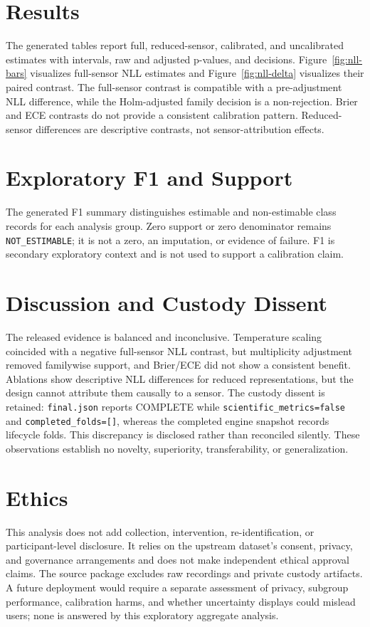 \documentclass[11pt]{article}
\begin{document}
\section{Results}
The generated tables report full, reduced-sensor, calibrated, and uncalibrated estimates with intervals, raw and adjusted p-values, and decisions. Figure~\ref{fig:nll-bars} visualizes full-sensor NLL estimates and Figure~\ref{fig:nll-delta} visualizes their paired contrast. The full-sensor contrast is compatible with a pre-adjustment NLL difference, while the Holm-adjusted family decision is a non-rejection. Brier and ECE contrasts do not provide a consistent calibration pattern. Reduced-sensor differences are descriptive contrasts, not sensor-attribution effects.




\section{Exploratory F1 and Support}
The generated F1 summary distinguishes estimable and non-estimable class records for each analysis group. Zero support or zero denominator remains \texttt{NOT\_ESTIMABLE}; it is not a zero, an imputation, or evidence of failure. F1 is secondary exploratory context and is not used to support a calibration claim.

\section{Discussion and Custody Dissent}
The released evidence is balanced and inconclusive. Temperature scaling coincided with a negative full-sensor NLL contrast, but multiplicity adjustment removed familywise support, and Brier/ECE did not show a consistent benefit. Ablations show descriptive NLL differences for reduced representations, but the design cannot attribute them causally to a sensor. The custody dissent is retained: \texttt{final.json} reports COMPLETE while \texttt{scientific\_metrics=false} and \texttt{completed\_folds=[]}, whereas the completed engine snapshot records \resultFolds{} lifecycle folds. This discrepancy is disclosed rather than reconciled silently. These observations establish no novelty, superiority, transferability, or generalization.

\section{Ethics}
This analysis does not add collection, intervention, re-identification, or participant-level disclosure. It relies on the upstream dataset's consent, privacy, and governance arrangements and does not make independent ethical approval claims. The source package excludes raw recordings and private custody artifacts. A future deployment would require a separate assessment of privacy, subgroup performance, calibration harms, and whether uncertainty displays could mislead users; none is answered by this exploratory aggregate analysis.
\end{document}

